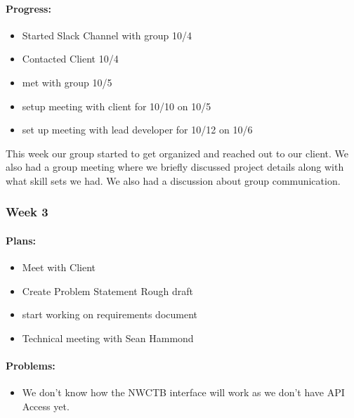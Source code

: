 \documentclass[onecolumn, draftclsnofoot,10pt, compsoc]{article}
\begin{document}
		    \paragraph{Progress:} \hfill \break
		    \begin{itemize}
		        \item Started Slack Channel with group 10/4
		        \item Contacted Client 10/4
		        \item met with group 10/5
		        \item setup meeting with client for 10/10 on 10/5
		        \item set up meeting with lead developer for 10/12 on 10/6
		    \end{itemize}
		    
		     \hfill \break
		         This week our group started to get organized and reached out to our client. We also had a group meeting where we briefly discussed project details along with what skill sets we had. We also had a discussion about group communication.\\
		         
		\subsubsection{Week 3}
		
		    \paragraph{Plans:} \hfill \break
		        
		        \begin{itemize}
		            \item Meet with Client
		            \item Create Problem Statement Rough draft
		            \item start working on requirements document
		            \item Technical meeting with Sean Hammond
		        \end{itemize}
		        
		    \paragraph{Problems:} \hfill \break
		    
		    \begin{itemize}
		        \item We don't know how the NWCTB interface will work as we don't have API Access yet.
		    \end{itemize}
		
\end{document}
